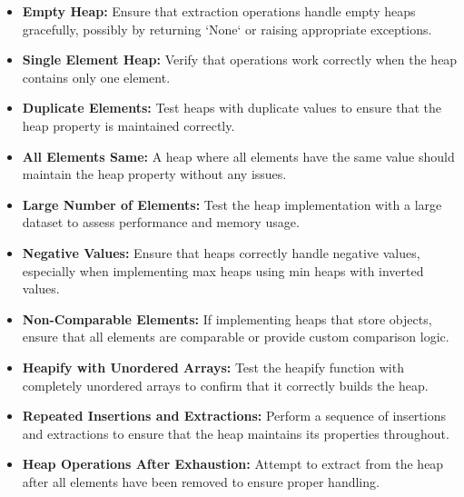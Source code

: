 \begin{itemize}
    \item \textbf{Empty Heap:} Ensure that extraction operations handle empty heaps gracefully, possibly by returning `None` or raising appropriate exceptions.
    
    \item \textbf{Single Element Heap:} Verify that operations work correctly when the heap contains only one element.
    
    \item \textbf{Duplicate Elements:} Test heaps with duplicate values to ensure that the heap property is maintained correctly.
    
    \item \textbf{All Elements Same:} A heap where all elements have the same value should maintain the heap property without any issues.
    
    \item \textbf{Large Number of Elements:} Test the heap implementation with a large dataset to assess performance and memory usage.
    
    \item \textbf{Negative Values:} Ensure that heaps correctly handle negative values, especially when implementing max heaps using min heaps with inverted values.
    
    \item \textbf{Non-Comparable Elements:} If implementing heaps that store objects, ensure that all elements are comparable or provide custom comparison logic.
    
    \item \textbf{Heapify with Unordered Arrays:} Test the heapify function with completely unordered arrays to confirm that it correctly builds the heap.
    
    \item \textbf{Repeated Insertions and Extractions:} Perform a sequence of insertions and extractions to ensure that the heap maintains its properties throughout.
    
    \item \textbf{Heap Operations After Exhaustion:} Attempt to extract from the heap after all elements have been removed to ensure proper handling.
\end{itemize}

\printindex